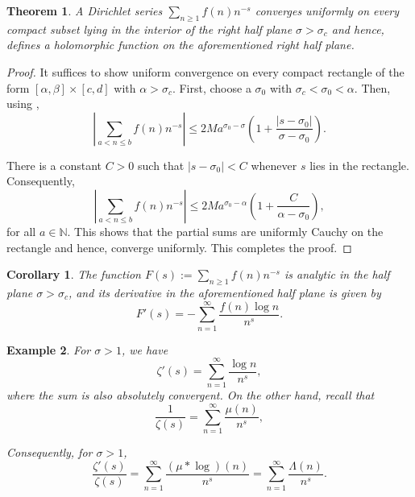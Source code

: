 \documentclass[12pt]{article}
\theoremstyle{thmstyle}
\newtheorem{theorem}{Theorem}[section]
\theoremstyle{defstyle}
\newtheorem*{corollary}{Corollary}
\newtheorem{example}[theorem]{Example}
\renewcommand{\le}{\leqslant}
\renewcommand{\ge}{\geqslant}
\begin{document}
\begin{theorem}
    A Dirichlet series $\sum_{n\ge 1} f(n)n^{-s}$ converges uniformly on every compact subset lying in the interior of the right half plane $\sigma > \sigma_c$ and hence, defines a holomorphic function on the aforementioned right half plane.
\end{theorem}
\begin{proof}
    It suffices to show uniform convergence on every compact rectangle of the form $[\alpha,\beta]\times[c,d]$ with $\alpha > \sigma_c$. First, choose a $\sigma_0$ with $\sigma_c < \sigma_0 < \alpha$. Then, using , 
    \begin{equation*}
        \left|\sum_{a < n\le b} f(n)n^{-s}\right|\le 2M a^{\sigma_0 - \sigma}\left(1 + \frac{|s - \sigma_0|}{\sigma - \sigma_0}\right).
    \end{equation*}

    There is a constant $C > 0$ such that $|s - \sigma_0| < C$ whenever $s$ lies in the rectangle. Consequently, 
    \begin{equation*}
        \left|\sum_{a < n\le b}f(n)n^{-s}\right|\le 2Ma^{\sigma_0 - \alpha}\left(1 + \frac{C}{\alpha - \sigma_0}\right),
    \end{equation*}
    for all $a\in\mathbb N$. This shows that the partial sums are uniformly Cauchy on the rectangle and hence, converge uniformly. This completes the proof.
\end{proof}

\begin{corollary}
    The function $F(s) := \sum_{n\ge 1}f(n)n^{-s}$ is analytic in the half plane $\sigma > \sigma_c$, and its derivative in the aforementioned half plane is given by 
    \begin{equation*}
        F'(s) = -\sum_{n = 1}^\infty\frac{f(n)\log n}{n^s}.
    \end{equation*}
\end{corollary}

\begin{example}
    For $\sigma > 1$, we have 
    \begin{equation*}
        \zeta'(s) = \sum_{n = 1}^\infty\frac{\log n}{n^s},
    \end{equation*}
    where the sum is also absolutely convergent. On the other hand, recall that 
    \begin{equation*}
        \frac{1}{\zeta(s)} = \sum_{n = 1}^\infty\frac{\mu(n)}{n^s},
    \end{equation*}

    Consequently, for $\sigma > 1$, 
    \begin{equation*}
        \frac{\zeta'(s)}{\zeta(s)} = \sum_{n = 1}^\infty\frac{(\mu\ast\log)(n)}{n^s} = \sum_{n = 1}^\infty\frac{\Lambda(n)}{n^s}.
    \end{equation*}
\end{example}
\end{document}
